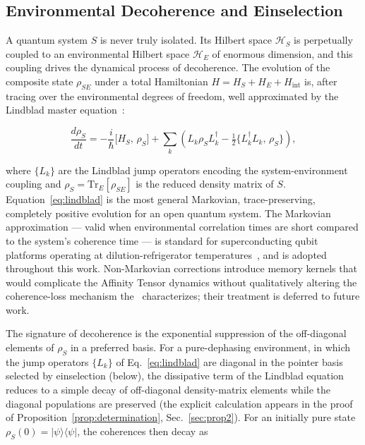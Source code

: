 
\subsection{\label{sec:decoherence}Environmental Decoherence and Einselection}

A quantum system $S$ is never truly isolated.
Its Hilbert space $\mathcal{H}_S$ is perpetually coupled to an
environmental Hilbert space $\mathcal{H}_E$ of enormous dimension, and
this coupling drives the dynamical process of decoherence.
The evolution of the composite state $\rho_{SE}$ under a total
Hamiltonian $H = H_S + H_E + H_{\mathrm{int}}$ is, after tracing over
the environmental degrees of freedom, well approximated by the
Lindblad master equation~\cite{Lindblad1976,GKS1976,NielsenChuang2000}:

\begin{equation}
\label{eq:lindblad}
\frac{d\rho_S}{dt}
  = -\frac{i}{\hbar}\bigl[H_S,\, \rho_S\bigr]
    + \sum_k \!\left(
        L_k \rho_S L_k^{\dagger}
        - \tfrac{1}{2}\bigl\{ L_k^{\dagger} L_k,\, \rho_S \bigr\}
      \right),
\end{equation}

\noindent
where $\{L_k\}$ are the Lindblad jump operators encoding the
system-environment coupling and $\rho_S = \mathrm{Tr}_E[\rho_{SE}]$
is the reduced density matrix of $S$.
Equation~\eqref{eq:lindblad} is the most general Markovian,
trace-preserving, completely positive evolution for an open quantum
system.
The Markovian approximation --- valid when environmental correlation
times are short compared to the system's coherence time --- is standard
for superconducting qubit platforms operating at dilution-refrigerator
temperatures~\cite{Krantz2019}, and is adopted throughout this work.
Non-Markovian corrections introduce memory kernels that would complicate
the Affinity Tensor dynamics without qualitatively altering the
coherence-loss mechanism the \RCT~characterizes; their treatment is
deferred to future work.

The signature of decoherence is the exponential suppression of the
off-diagonal elements of $\rho_S$ in a preferred basis.
For a pure-dephasing environment, in which the jump operators $\{L_k\}$
of Eq.~\eqref{eq:lindblad} are diagonal in the pointer basis selected
by einselection (below), the dissipative term of the Lindblad equation
reduces to a simple decay of off-diagonal density-matrix elements while
the diagonal populations are preserved
(the explicit calculation appears in the proof of
Proposition~\ref{prop:determination}, Sec.~\ref{sec:prop2}).
For an initially pure state $\rho_S(0) = \vert\psi\rangle\langle\psi\vert$,
the coherences then decay as

